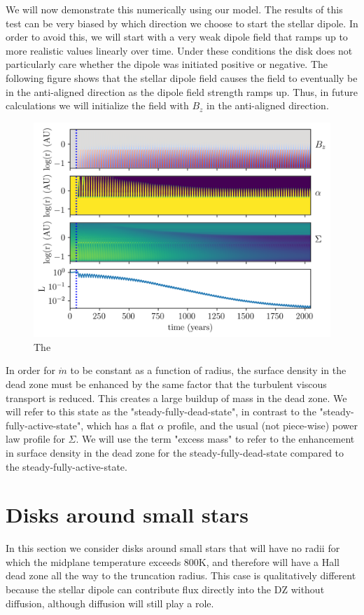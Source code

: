 We will now demonstrate this numerically using our model.  The results of this test can be very biased by which direction we choose to start the stellar dipole.  In order to avoid this, we will start with a very weak dipole field that ramps up to more realistic values linearly over time.  Under these conditions the disk does not particularly care whether the dipole was initiated positive or negative.  The following figure shows that the stellar dipole field causes the field to eventually be in the anti-aligned direction as the dipole field strength ramps up.  Thus, in future calculations we will initialize the field with $B_z$ in the anti-aligned direction.    

\begin{figure}[h!]
\centering
\includegraphics[width=0.8\columnwidth]{figs/figsChapter3/run3077/MST1.png}
\caption{The}
\label{fiStExample}
\end{figure}

 In order for $\dot{m}$ to be constant as a function of radius, the surface density in the dead zone must be enhanced by the same factor that the turbulent viscous transport is reduced.  This creates a large buildup of mass in the dead zone.  We will refer to this state as the "steady-fully-dead-state", in contrast to the "steady-fully-active-state", which has a flat $\alpha$ profile, and the usual (not piece-wise) power law profile for $\Sigma$.  We will use the term "excess mass" to refer to the enhancement in surface density in the dead zone for the steady-fully-dead-state compared to the steady-fully-active-state.   





\section{Disks around small stars}
In this section we consider disks around small stars that will have no radii for which the midplane temperature exceeds 800K, and therefore will have a Hall dead zone all the way to the truncation radius.  This case is qualitatively different because the stellar dipole can contribute flux directly into the DZ without diffusion, although diffusion will still play a role.  

